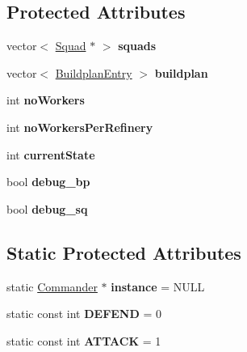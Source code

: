 \subsection*{Protected Attributes}
\begin{DoxyCompactItemize}
\item 
\hypertarget{class_commander_af71903fbccb16d577db18047a659d159}{vector$<$ \hyperlink{class_squad}{Squad} $\ast$ $>$ {\bfseries squads}}\label{class_commander_af71903fbccb16d577db18047a659d159}

\item 
\hypertarget{class_commander_a97aaa4c9bf3d52e8a40c6b21309de075}{vector$<$ \hyperlink{class_buildplan_entry}{Buildplan\-Entry} $>$ {\bfseries buildplan}}\label{class_commander_a97aaa4c9bf3d52e8a40c6b21309de075}

\item 
\hypertarget{class_commander_ae37f77ed20543e6cac82d271eeeee688}{int {\bfseries no\-Workers}}\label{class_commander_ae37f77ed20543e6cac82d271eeeee688}

\item 
\hypertarget{class_commander_ac870a4458255b8d8b6fcf154d984519d}{int {\bfseries no\-Workers\-Per\-Refinery}}\label{class_commander_ac870a4458255b8d8b6fcf154d984519d}

\item 
\hypertarget{class_commander_af343be3aa50c91a9d62e4dabcb223026}{int {\bfseries current\-State}}\label{class_commander_af343be3aa50c91a9d62e4dabcb223026}

\item 
\hypertarget{class_commander_ae59f41b6cfaab239f236ae671a9705f9}{bool {\bfseries debug\-\_\-bp}}\label{class_commander_ae59f41b6cfaab239f236ae671a9705f9}

\item 
\hypertarget{class_commander_a620ea7c592fc5380440f7f16a8591ba8}{bool {\bfseries debug\-\_\-sq}}\label{class_commander_a620ea7c592fc5380440f7f16a8591ba8}

\end{DoxyCompactItemize}
\subsection*{Static Protected Attributes}
\begin{DoxyCompactItemize}
\item 
\hypertarget{class_commander_a508775a065cb2aa9c2d3fd26f4d23943}{static \hyperlink{class_commander}{Commander} $\ast$ {\bfseries instance} = N\-U\-L\-L}\label{class_commander_a508775a065cb2aa9c2d3fd26f4d23943}

\item 
\hypertarget{class_commander_a48746e31693acaf1f8a794d257bc56d0}{static const int {\bfseries D\-E\-F\-E\-N\-D} = 0}\label{class_commander_a48746e31693acaf1f8a794d257bc56d0}

\item 
\hypertarget{class_commander_ad97c2a76ba45781c23a5910fef556ce6}{static const int {\bfseries A\-T\-T\-A\-C\-K} = 1}\label{class_commander_ad97c2a76ba45781c23a5910fef556ce6}

\end{DoxyCompactItemize}


